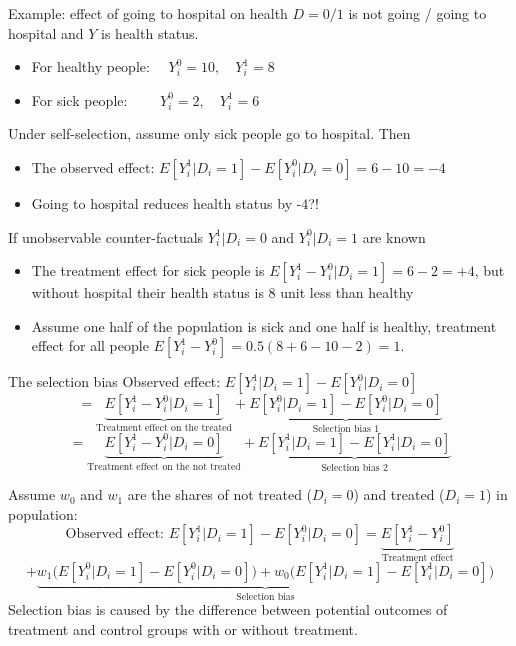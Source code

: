 \documentclass{beamer}
\begin{document}
\begin{frame}{Example: effect of going to hospital on health}
$D=0/1$ is not going / going to hospital and $Y$ is health status.
\begin{itemize}
\item For healthy people: $\quad Y_i^0=10,\quad Y_i^1=8$
\item For sick people: $\qquad Y_i^0=2, \quad Y_i^1=6$
\end{itemize}\medskip
Under self-selection, assume only sick people go to hospital. Then
\begin{itemize}
\item The observed effect: $E[Y_i^1|D_i=1]-E[Y_i^0|D_i=0]=6-10=-4$
\item Going to hospital reduces health status by -4?!
\end{itemize}\bigskip

If unobservable counter-factuals $Y_i^1|D_i=0$ and $Y_i^0|D_i=1$ are known
\begin{itemize}
\item The treatment effect for sick people is $E[Y_i^1-Y_i^0|D_i=1]=6-2=+4$, but without hospital their health status is 8 unit less than healthy
\item Assume one half of the population is sick and one half is healthy,
treatment effect for all people $E[Y_i^1-Y_i^0]=0.5(8+6-10-2)=1$.

\end{itemize}

\end{frame}

\begin{frame}{The selection bias}
Observed effect: $E[Y^1_{i}|D_i=1]-E[Y^0_{i}|D_i=0]$
\[=\underbrace{E[Y^1_{i}-Y^0_{i}|D_i=1]}_{\text{Treatment effect on the treated}}+\underbrace{E[Y^0_{i}|D_i=1]-E[Y^0_{i}|D_i=0]}_{\text{Selection bias 1}} \]\[=\underbrace{E[Y^1_{i}-Y^0_{i}|D_i=0]}_{\text{Treatment effect on the not treated}}+\underbrace{E[Y^1_{i}|D_i=1]-E[Y^1_{i}|D_i=0]}_{\text{Selection bias 2}} \]\medskip\pause

Assume $w_0$ and $w_1$ are the shares of not treated ($D_i=0$) and treated ($D_i=1$) in population:
\[\text{Observed effect:  } E[Y^1_{i}|D_i=1]-E[Y^0_{i}|D_i=0]=\underbrace{E[Y^1_{i}-Y^0_{i}]}_{\text{Treatment effect}}\] \[+\underbrace{w_1\big(E[Y^0_{i}|D_i=1]-E[Y^0_{i}|D_i=0]\big)+w_0\big(E[Y_i^1|D_i=1]-E[Y_i^1|D_i=0]\big)}_{\text{Selection bias}} \]
Selection bias is caused by the difference between potential outcomes of treatment and control groups with or without treatment.
\end{frame}
\end{document}
